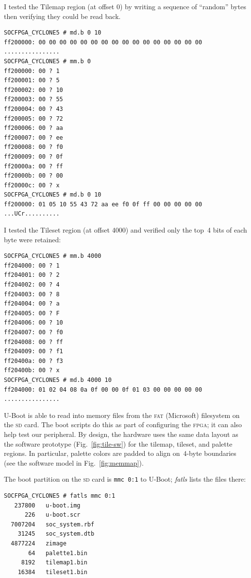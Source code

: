 \documentclass[11pt]{article}
\newcommand{\figref}[1]{Fig.~\ref{fig:#1}}
\begin{document}
\clearpage

I tested the Tilemap region (at offset 0) by writing a sequence of
``random'' bytes then verifying they could be read back.

{\footnotesize 
\begin{verbatim}
SOCFPGA_CYCLONE5 # md.b 0 10 
ff200000: 00 00 00 00 00 00 00 00 00 00 00 00 00 00 00 00    ................
SOCFPGA_CYCLONE5 # mm.b 0
ff200000: 00 ? 1
ff200001: 00 ? 5
ff200002: 00 ? 10
ff200003: 00 ? 55
ff200004: 00 ? 43
ff200005: 00 ? 72
ff200006: 00 ? aa
ff200007: 00 ? ee
ff200008: 00 ? f0
ff200009: 00 ? 0f
ff20000a: 00 ? ff
ff20000b: 00 ? 00
ff20000c: 00 ? x
SOCFPGA_CYCLONE5 # md.b 0 10
ff200000: 01 05 10 55 43 72 aa ee f0 0f ff 00 00 00 00 00    ...UCr..........
\end{verbatim}
}

I tested the Tileset region (at offset 4000) and verified only the
top~4 bits of each byte were retained:

{\footnotesize 
\begin{verbatim}
SOCFPGA_CYCLONE5 # mm.b 4000 
ff204000: 00 ? 1
ff204001: 00 ? 2
ff204002: 00 ? 4
ff204003: 00 ? 8 
ff204004: 00 ? a
ff204005: 00 ? F
ff204006: 00 ? 10
ff204007: 00 ? f0
ff204008: 00 ? ff
ff204009: 00 ? f1
ff20400a: 00 ? f3
ff20400b: 00 ? x
SOCFPGA_CYCLONE5 # md.b 4000 10
ff204000: 01 02 04 08 0a 0f 00 00 0f 01 03 00 00 00 00 00    ................
\end{verbatim}
}

\clearpage

U-Boot is able to read into memory files from the \textsc{fat}
(Microsoft) filesystem on the \textsc{sd} card.  The boot scripts do
this as part of configuring the \textsc{fpga}; it can also help test
our peripheral.  By design, the hardware uses the same data layout as
the software prototype (\figref{tile-sw}) for the tilemap, tileset,
and palette regions.  In particular, palette colors are padded to
align on~4-byte boundaries (see the software model in \figref{memmap}).

The boot partition on the \textsc{sd} card is \texttt{mmc 0:1} to
U-Boot; \emph{fatls} lists the files there:

{\footnotesize
\begin{verbatim}
SOCFPGA_CYCLONE5 # fatls mmc 0:1 
   237800   u-boot.img 
      226   u-boot.scr 
  7007204   soc_system.rbf 
    31245   soc_system.dtb 
  4877224   zimage 
       64   palette1.bin 
     8192   tilemap1.bin 
    16384   tileset1.bin
\end{verbatim}
}
\end{document}
